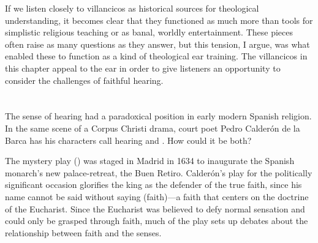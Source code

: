 
If we listen closely to villancicos as historical sources for theological
understanding, it becomes clear that they functioned as much more than tools for
simplistic religious teaching or as banal, worldly entertainment.
These pieces often raise as many questions as they answer, but this tension, I
argue, was what enabled these to function as a kind of theological ear training.
The villancicos in this chapter appeal to the ear in order to give listeners an
opportunity to consider the challenges of faithful hearing.



\section{}

The sense of hearing had a paradoxical position in early modern Spanish
religion.
In the same scene of a Corpus Christi drama, court poet Pedro Calderón de la
Barca has his characters call hearing 
and .
How could it be both?

The mystery play () 
was staged in Madrid in 1634 to inaugurate the Spanish monarch's new
palace-retreat, the Buen Retiro.%
    \Autocite{Calderon:Retiro}
Calderón's play for the politically significant occasion glorifies the king as
the defender of the true faith, since his name  cannot be said
without saying  (faith)---a faith that centers on the doctrine of the
Eucharist.
Since the Eucharist was believed to defy normal sensation and could only be
grasped through faith, much of the play sets up debates about the relationship
between faith and the senses.


